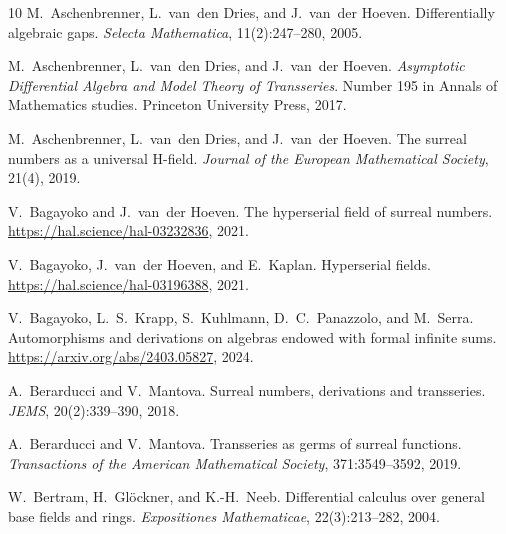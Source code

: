 \documentclass{article}
\theoremstyle{remark}\newtheorem*{convention*}{Convention}
\begin{document}
\begin{thebibliography}{10}
  M.~Aschenbrenner, L.~van~den Dries, and  J.~van~der
  Hoeven. {\newblock}Differentially algebraic gaps.
  {\newblock}\textit{Selecta Mathematica}, 11(2):247--280, 2005.{\newblock}
  
  M.~Aschenbrenner, L.~van~den Dries, and  J.~van~der
  Hoeven. {\newblock}\textit{Asymptotic Differential Algebra and Model
  Theory of Transseries}. {\newblock}Number  195  in  Annals of Mathematics
  studies. Princeton University Press, 2017.{\newblock}
  
  M.~Aschenbrenner, L.~van~den Dries, and  J.~van~der
  Hoeven. {\newblock}The surreal numbers as a universal H-field.
  {\newblock}\textit{Journal of the European Mathematical Society}, 21(4),
  2019.{\newblock}
  
  V.~Bagayoko  and  J.~van~der Hoeven. {\newblock}The
  hyperserial field of surreal numbers.
  {\newblock}\href{https://hal.science/hal-03232836}{\href{Https://hal.science/hal-03232836}{}https://hal.science/hal-03232836},
  2021.{\newblock}
  
  V.~Bagayoko, J.~van~der Hoeven, and  E.~Kaplan.
  {\newblock}Hyperserial fields.
  {\newblock}\href{https://hal.science/hal-03196388}{\href{Https://hal.science/hal-03196388}{}\href{https://hal.science/hal-03196388}{}https://hal.science/hal-03196388},
  2021.{\newblock}
  
  V.~Bagayoko, L.~S.~Krapp, S.~Kuhlmann,
  D.~C.~Panazzolo, and  M.~Serra. {\newblock}Automorphisms and derivations on
  algebras endowed with formal infinite sums.
  {\newblock}\href{https://arxiv.org/abs/2403.05827}{\href{Https://arxiv.org/abs/2403.05827}{}https://arxiv.org/abs/2403.05827},
  2024.{\newblock}
  
  A.~Berarducci  and  V.~Mantova. {\newblock}Surreal numbers,
  derivations and transseries. {\newblock}\textit{JEMS}, 20(2):339--390,
  2018.{\newblock}
  
  A.~Berarducci  and  V.~Mantova. {\newblock}Transseries as
  germs of surreal functions. {\newblock}\textit{Transactions of the
  American Mathematical Society}, 371:3549--3592, 2019.{\newblock}
  
  W.~Bertram, H.~Gl{\"o}ckner, and  K.-H.~Neeb.
  {\newblock}Differential calculus over general base fields and rings.
  {\newblock}\textit{Expositiones Mathematicae}, 22(3):213--282,
  2004.{\newblock}
  

\end{thebibliography}
\end{document}
